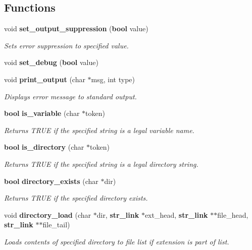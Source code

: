 \subsection*{Functions}
\begin{CompactItemize}
\item 
void {\bf set\_\-output\_\-suppression} ({\bf bool} value)
\begin{CompactList}\small\item\em Sets error suppression to specified value.\item\end{CompactList}\item 
void {\bf set\_\-debug} ({\bf bool} value)
\item 
void {\bf print\_\-output} (char $\ast$msg, int type)
\begin{CompactList}\small\item\em Displays error message to standard output.\item\end{CompactList}\item 
{\bf bool} {\bf is\_\-variable} (char $\ast$token)
\begin{CompactList}\small\item\em Returns TRUE if the specified string is a legal variable name.\item\end{CompactList}\item 
{\bf bool} {\bf is\_\-directory} (char $\ast$token)
\begin{CompactList}\small\item\em Returns TRUE if the specified string is a legal directory string.\item\end{CompactList}\item 
{\bf bool} {\bf directory\_\-exists} (char $\ast$dir)
\begin{CompactList}\small\item\em Returns TRUE if the specified directory exists.\item\end{CompactList}\item 
void {\bf directory\_\-load} (char $\ast$dir, {\bf str\_\-link} $\ast$ext\_\-head, {\bf str\_\-link} $\ast$$\ast$file\_\-head, {\bf str\_\-link} $\ast$$\ast$file\_\-tail)
\begin{CompactList}\small\item\em Loads contents of specified directory to file list if extension is part of list.\item\end{CompactList}\item 

\end{CompactItemize}
